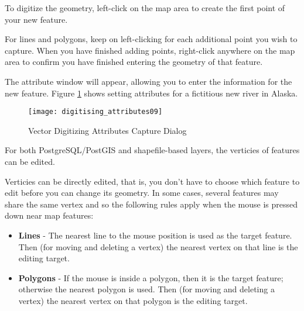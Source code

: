 To digitize the geometry, left-click on the map area to create the
first point of your new feature.

For lines and polygons, keep on left-clicking for each additional
point you wish to capture.  When you have finished adding points,
right-click anywhere on the map area to confirm you have finished entering
the geometry of that feature.

The attribute window will appear, allowing you to enter the information for the new feature.
Figure \ref{fig:vector_digitising} shows setting attributes for a fictitious
new river in Alaska.

\begin{figure}[ht]
   \begin{center}
   \caption{Vector Digitizing Attributes Capture
Dialog}\label{fig:vector_digitising}\smallskip
   \texttt{[image: digitising\_attributes09]}
\end{center}  
\end{figure}

\begin{Tip}[h]\caption{\textsc{Attribute Value Types}}
\end{Tip}

%
%
%
%
%


For both PostgreSQL/PostGIS and shapefile-based layers, the verticies of features can be edited. 

Verticies can be directly edited, that is, you don't
have to choose which feature to edit before you can change
its geometry.
In some cases, several features may share the same vertex
and so the following rules apply when the mouse is pressed
down near map features:

\begin{itemize}
\item \textbf{Lines}    - The nearest line to the mouse position
                          is used as the target feature.
                          Then (for moving and deleting a vertex)
                          the nearest vertex
                          on that line is the editing target.

\item \textbf{Polygons} - If the mouse is inside a polygon, then it is
                          the target feature; otherwise the nearest polygon
                          is used.
                          Then (for moving and deleting a vertex)
                          the nearest vertex
                          on that polygon is the editing target.
\end{itemize}

